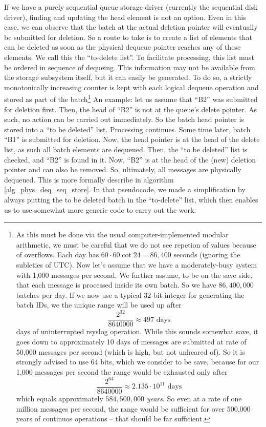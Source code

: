 \documentclass[a4paper,10pt]{article}
\begin{document}
If we have a purely sequential queue storage driver (currently the sequential disk driver), finding and updating the head element is not an option. Even in this case, we can observe that the batch at the actual deletion pointer will eventually be submitted for deletion. So a route to take is to create a list of elements that can be deleted as soon as the physical dequeue pointer reaches any of these elements. We call this the ``to-delete list''. To facilitate processing, this list must be ordered in sequence of dequeing. This information may not be available from the storage subsystem itself, but it can easily be generated. To do so, a strictly monotonically increasing counter is kept with each logical dequeue operation and stored as part of the batch\footnote{As this must be done via the usual computer-implemented modular arithmetic, we must be careful that we do not see repetion of values because of overflows. Each day has $60 \cdot 60 \cot 24 = 86,400$ seconds (ignoring the subleties of UTC). Now let's assume that we have a moderately-busy system with 1,000 messages per second. We further assume, to be on the save side, that each message is processed inside its own batch. So we have $86,400,000$ batches per day. If we now use a typical $32$-bit integer for generating the batch IDs, we the unique range will be used up after
$$\frac{2^{32}}{8640000} \approx 497 \text{ days}$$
days of uninterrupted rsyslog operation. While this sounds somewhat save, it goes down to approximately 10 days of messages are submitted at rate of 50,000 messages per second (which is high, but not unheared of). So it is strongly advised to use 64 bits, which we consider to be save, because for our 1,000 messages per second the range would be exhausted only after
$$\frac{2^{64}}{8640000} \approx 2.135 \cdot 10^{11} \text{ days}$$
which equals approximately $584,500,000$ \emph{years}. So even at a rate of one million messages per second, the range would be sufficient for over 500,000 years of continuos operations -- that should be far sufficient.}
An example: let us assume that ``B2'' was submitted for deletion first. Then, the head of ``B2'' is not at the queue's delete pointer. As such, no action can be carried out immediately. So the batch head pointer is stored into a ``to be deleted'' list. Processing continues. Some time later, batch ``B1'' is submitted for deletion. Now, the head pointer is at the head of the delete list, as such all batch elements are dequeued. Then, the ``to be deleted'' list is checked, and ``B2'' is found in it. Now, ``B2'' is at the head of the (new) deletion pointer and can also be removed. So, ultimately, all messages are physically dequeued. This is more formally describe in algorithm \ref{alg_phys_deq_seq_store}. In that pseudocode, we made a simplification by always putting the to be deleted batch in the ``to-delete'' list, which then enables us to use somewhat more generic code to carry out the work.
\end{document}
